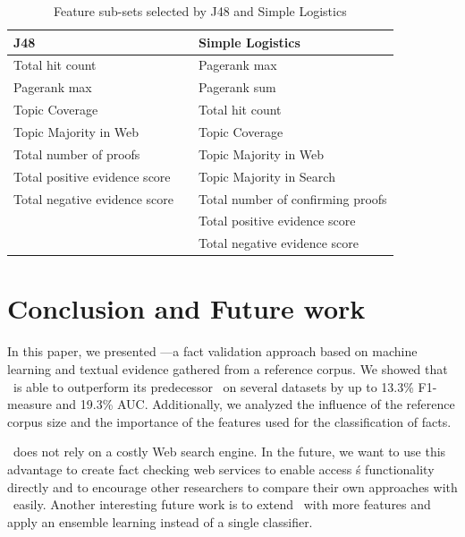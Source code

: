 \begin{table}
\footnotesize
\setlength{\tabcolsep}{2pt}
\caption{Feature sub-sets selected by J48 and Simple Logistics}
\label{table:Subset_Eval1}
\centering
\begin{tabular}{lp{1cm}l}
    \toprule
    {\textbf{J48}} & & {\textbf{Simple Logistics}}\\
    \midrule
    Total hit count & & Pagerank max\\
    Pagerank max & & Pagerank sum\\
    Topic Coverage & & Total hit count\\
    Topic Majority in Web & & Topic Coverage\\
    Total number of proofs & & Topic Majority in Web\\
    Total positive evidence score & & Topic Majority in Search\\
    Total negative evidence score & & Total number of confirming proofs\\
    & & Total positive evidence score\\
    & & Total negative evidence score\\
    \bottomrule
\end{tabular}
\end{table}

\section{Conclusion and Future work}
\label{sec:conclusion}

In this paper, we presented \FactCheck---a fact validation approach based on machine learning and textual evidence gathered from a reference corpus.
We showed that \FactCheck\ is able to outperform its predecessor \DeFacto\ on several datasets by up to 13.3\% F1-measure and 19.3\% AUC. Additionally, we analyzed the influence of the reference corpus size and the importance of the features used for the classification of facts.

\FactCheck\ does not rely on a costly Web search engine.
In the future, we want to use this advantage to create fact checking web services to enable access \FactCheck\'s functionality directly and to encourage other researchers to compare their own approaches with \FactCheck\ easily. Another interesting future work is to extend \FactCheck\ with more features and apply an ensemble learning instead of a single classifier.